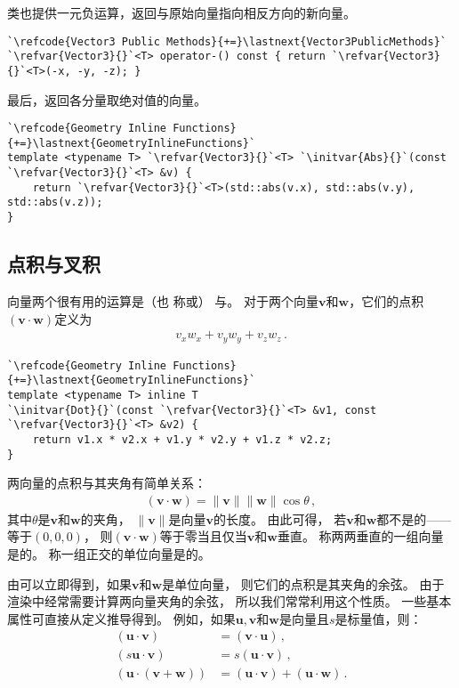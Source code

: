 类也提供一元负运算，返回与原始向量指向相反方向的新向量。
\begin{lstlisting}
`\refcode{Vector3 Public Methods}{+=}\lastnext{Vector3PublicMethods}`
`\refvar{Vector3}{}`<T> operator-() const { return `\refvar{Vector3}{}`<T>(-x, -y, -z); }
\end{lstlisting}

最后，返回各分量取绝对值的向量。
\begin{lstlisting}
`\refcode{Geometry Inline Functions}{+=}\lastnext{GeometryInlineFunctions}`
template <typename T> `\refvar{Vector3}{}`<T> `\initvar{Abs}{}`(const `\refvar{Vector3}{}`<T> &v) {
    return `\refvar{Vector3}{}`<T>(std::abs(v.x), std::abs(v.y), std::abs(v.z));
}
\end{lstlisting}

\subsection{点积与叉积}\label{sub:点积与叉积}
向量两个很有用的运算是（也
称或）
与。
对于两个向量$\bm v$和$\bm w$，它们的点积$(\bm v \cdot \bm w)$定义为
\begin{align*}
    v_x w_x+ v_y w_y+ v_z w_z\, .
\end{align*}
\begin{lstlisting}
`\refcode{Geometry Inline Functions}{+=}\lastnext{GeometryInlineFunctions}`
template <typename T> inline T
`\initvar{Dot}{}`(const `\refvar{Vector3}{}`<T> &v1, const `\refvar{Vector3}{}`<T> &v2) {
    return v1.x * v2.x + v1.y * v2.y + v1.z * v2.z;
}
\end{lstlisting}

两向量的点积与其夹角有简单关系：
\begin{align}\label{eq:2.1}
    (\bm v \cdot \bm w)=\|\bm v\|\|\bm w\|\cos\theta\, ,
\end{align}
其中$\theta$是$\bm v$和$\bm w$的夹角，
$\|\bm v\|$是向量$\bm v$的长度。
由此可得，
若$\bm v$和$\bm w$都不是的——等于$(0,0,0)$，
则$(\bm v \cdot \bm w)$等于零当且仅当$\bm v$和$\bm w$垂直。
称两两垂直的一组向量是的。
称一组正交的单位向量是的。

由可以立即得到，如果$\bm v$和$\bm w$是单位向量，
则它们的点积是其夹角的余弦。
由于渲染中经常需要计算两向量夹角的余弦，
所以我们常常利用这个性质。
一些基本属性可直接从定义推导得到。
例如，如果$\bm u,\bm v$和$\bm w$是向量且$s$是标量值，则：
\begin{align*}
    (\bm u\cdot\bm v)         & =(\bm v\cdot\bm u)\, ,                   \\
    (s\bm u\cdot\bm v)        & =s(\bm u\cdot\bm v)\, ,                  \\
    (\bm u\cdot(\bm v+\bm w)) & =(\bm u\cdot\bm v)+(\bm u\cdot\bm w)\, .
\end{align*}

